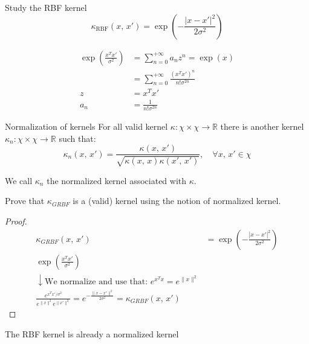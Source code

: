 \begin{exercise}{Study the RBF kernel}{}
	\begin{equation*}
		\kappa_{\text{RBF}}(x,\,x') = \exp\left(-\frac{|x-x'|^2}{2\sigma^2}\right)
	\end{equation*}

	\begin{figure}[H]
	\end{figure}

	\tcblower
	\begin{align*}
		\exp\left(
		\frac{x^Tx'}{\sigma^2}
		\right)
		    & = \sum_{n=0}^{+\infty} a_n z^n = \exp(x)               \\
		    & = \sum_{n=0}^{+\infty} \frac{(x^Tx')^n}{n!\sigma^{2n}} \\[0.5em]
		z   & = x^Tx'                                                \\
		a_n & = \frac{1}{n!\sigma^{2n}}
	\end{align*}
\end{exercise}

\begin{definition}{Normalization of kernels}{}
	For all valid kernel $\kappa : \chi \times \chi \to \mathds R$
	there is another kernel $\kappa_n : \chi \times \chi \to \mathds R$
	such that:
	\begin{equation*}
		\kappa_n(x,\,x') = \frac{\kappa(x,\,x')}{\sqrt{\kappa(x,\,x)\kappa(x',\,x')}}, \quad \forall x,\,x' \in \chi
	\end{equation*}

	We call $\kappa_n$ the normalized kernel associated with $\kappa$.
\end{definition}

\begin{exercise}{Prove that
		$\kappa_{GRBF}$ is a (valid) kernel using the notion of
		normalized kernel.}{}

	\begin{proof}
		\begin{align*}
			\kappa_{GRBF}(x,\,x') & = \exp\left(-\frac{|x-x'|^2}{2\sigma^2}\right) \\[1em]
      \exp\left(\frac{x^Tx'}{\sigma^2}\right)   \tag{we know this is a valid kernel} \\
      \downarrow{} \text{We normalize and use that: } e^{x^Tx} = e^{\lVert x\rVert^2}                                        \\
			\frac{e^{x^Tx'/\sigma^2}}{
				e^{\lVert x\rVert^2}
				e^{\lVert x'\rVert^2}
			} = e^{-\frac{\lVert x-x'\rVert^2}{2\sigma^2}} = \kappa_{GRBF}(x,\,x')
		\end{align*}
	\end{proof}

	\begin{note}
		The RBF kernel is already a normalized kernel
	\end{note}
\end{exercise}

